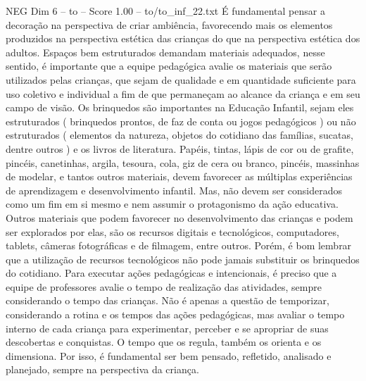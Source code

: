 \begin{textsample}{NEG Dim 6 – to – Score 1.00 – to/to\_inf\_22.txt}
É fundamental pensar a decoração na perspectiva de criar ambiência, favorecendo mais os elementos produzidos na perspectiva estética das crianças do que na perspectiva estética dos adultos.
Espaços bem estruturados demandam materiais adequados, nesse sentido, é importante que a equipe pedagógica avalie os materiais que serão utilizados pelas crianças, que sejam de qualidade e em quantidade suficiente para uso coletivo e individual a fim de que permaneçam ao alcance da criança e em seu campo de visão.
Os brinquedos são importantes na Educação Infantil, sejam eles estruturados ( brinquedos prontos, de faz de conta ou jogos pedagógicos ) ou não estruturados ( elementos da natureza, objetos do cotidiano das famílias, sucatas, dentre outros ) e os livros de literatura.
Papéis, tintas, lápis de cor ou de grafite, pincéis, canetinhas, argila, tesoura, cola, giz de cera ou branco, pincéis, massinhas de modelar, e tantos outros materiais, devem favorecer as múltiplas experiências de aprendizagem e desenvolvimento infantil.
Mas, não devem ser considerados como um fim em si mesmo e nem assumir o protagonismo da ação educativa.
Outros materiais que podem favorecer no desenvolvimento das crianças e podem ser explorados por elas, são os recursos digitais e tecnológicos, computadores, tablets, câmeras fotográficas e de filmagem, entre outros.
Porém, é bom lembrar que a utilização de recursos tecnológicos não pode jamais substituir os brinquedos do cotidiano.
Para executar ações pedagógicas e intencionais, é preciso que a equipe de professores avalie o tempo de realização das atividades, sempre considerando o tempo das crianças.
Não é apenas a questão de temporizar, considerando a rotina e os tempos das ações pedagógicas, mas avaliar o tempo interno de cada criança para experimentar, perceber e se apropriar de suas descobertas e conquistas.
O tempo que os regula, também os orienta e os dimensiona.
Por isso, é fundamental ser bem pensado, refletido, analisado e planejado, sempre na perspectiva da criança.

\end{textsample}
